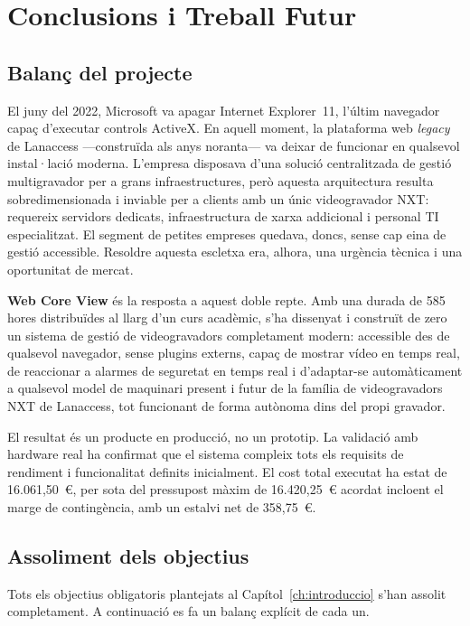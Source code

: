 \chapter{Conclusions i Treball Futur}
\label{ch:conclusions}

\section{Balanç del projecte}

El juny del 2022, Microsoft va apagar Internet Explorer~11, l'últim navegador capaç d'executar controls ActiveX. En aquell moment, la plataforma web \textit{legacy} de Lanaccess —construïda als anys noranta— va deixar de funcionar en qualsevol instal·lació moderna. L'empresa disposava d'una solució centralitzada de gestió multigravador per a grans infraestructures, però aquesta arquitectura resulta sobredimensionada i inviable per a clients amb un únic videogravador NXT: requereix servidors dedicats, infraestructura de xarxa addicional i personal TI especialitzat. El segment de petites empreses quedava, doncs, sense cap eina de gestió accessible. Resoldre aquesta escletxa era, alhora, una urgència tècnica i una oportunitat de mercat.

\textbf{Web Core View} és la resposta a aquest doble repte. Amb una durada de 585 hores distribuïdes al llarg d'un curs acadèmic, s'ha dissenyat i construït de zero un sistema de gestió de videogravadors completament modern: accessible des de qualsevol navegador, sense plugins externs, capaç de mostrar vídeo en temps real, de reaccionar a alarmes de seguretat en temps real i d'adaptar-se automàticament a qualsevol model de maquinari present i futur de la família de videogravadors NXT de Lanaccess, tot funcionant de forma autònoma dins del propi gravador.

El resultat és un producte en producció, no un prototip. La validació amb hardware real ha confirmat que el sistema compleix tots els requisits de rendiment i funcionalitat definits inicialment. El cost total executat ha estat de 16.061,50~\euro{}, per sota del pressupost màxim de 16.420,25~\euro{} acordat incloent el marge de contingència, amb un estalvi net de 358,75~\euro{}.

\section{Assoliment dels objectius}

Tots els objectius obligatoris plantejats al Capítol~\ref{ch:introduccio} s'han assolit completament. A continuació es fa un balanç explícit de cada un.


